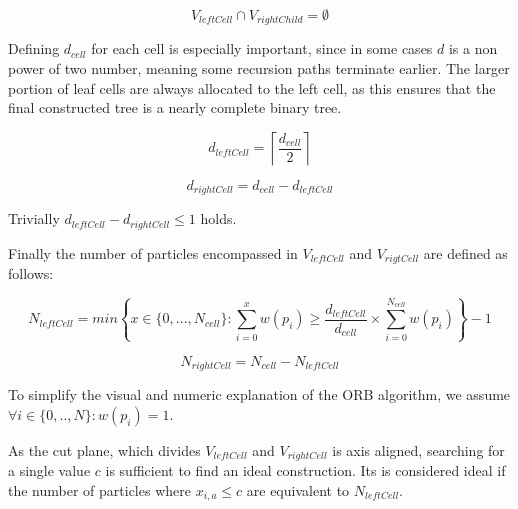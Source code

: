 \documentclass[]{article}
\begin{document}
\begin{center}
	\begin{equation}\label{eq:v2}
		V_{leftCell} \cap V_{rightChild} = \emptyset
	\end{equation}
\end{center}

Defining $d_{cell}$ for each cell is especially important, since in some cases $d$ is a non power of two number, meaning some recursion paths terminate earlier. The larger portion of leaf cells are always allocated to the left cell, as this ensures that the final constructed tree is a nearly complete binary tree. 

\begin{center}
	\begin{equation} \label{eq:d1}
		d_{leftCell} = \left \lceil\frac{d_{cell}}{2} \right \rceil 
	\end{equation}
\end{center}

\begin{center}
	\begin{equation}  \label{eq:d2}
		d_{rightCell} = d_{cell} - d_{leftCell}
	\end{equation}
\end{center}

Trivially $d_{leftCell} - d_{rightCell} \leq 1$ holds. 

Finally the number of particles encompassed in $V_{leftCell}$ and $V_{rigtCell}$ are defined as follows:

\begin{center}
	\begin{equation}\label{eq:N1}
		N_{leftCell} = min \left \{ x \in \{0,...,N_{cell} \} : \sum_{i=0}^{x} w(p_i) \geq \frac{d_{leftCell}}{d_{cell}} \times \sum_{i=0}^{N_{cell}} w(p_i) \right \} - 1
	\end{equation}
\end{center}

\begin{center}
	\begin{equation}\label{eq:N2}
		N_{rightCell} = N_{cell} - N_{leftCell}
	\end{equation}
\end{center}

To simplify the visual and numeric explanation of the ORB algorithm, we assume $\forall i \in \{0,..,N\} : w(p_i) = 1$.

As the cut plane, which divides $V_{leftCell}$ and $V_{rightCell}$ is axis aligned, searching for a single value $c$ is sufficient to find an ideal construction. Its is considered ideal if the number of particles where $x_{i,a} \leq c$ are equivalent to $N_{leftCell}$. 
\end{document}
